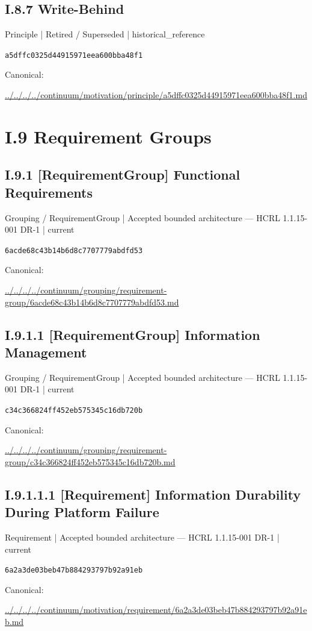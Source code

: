\documentclass[10pt,a4paper]{article}
\begin{document}
\subsection*{I.8.7 Write-Behind}
\label{element-a5dffc0325d44915971eea600bba48f1}
{\small Principle | Retired / Superseded | historical\_reference}\par
\texttt{a5dffc0325d44915971eea600bba48f1}\par
Canonical: \par
{\footnotesize\url{../../../../continuum/motivation/principle/a5dffc0325d44915971eea600bba48f1.md}}\par
\section*{I.9 Requirement Groups}
\subsection*{I.9.1 [RequirementGroup] Functional Requirements}
\label{element-6acde68c43b14b6d8c7707779abdfd53}
{\small Grouping / RequirementGroup | Accepted bounded architecture — HCRL 1.1.15-001 DR-1 | current}\par
\texttt{6acde68c43b14b6d8c7707779abdfd53}\par
Canonical: \par
{\footnotesize\url{../../../../continuum/grouping/requirement-group/6acde68c43b14b6d8c7707779abdfd53.md}}\par
\subsection*{I.9.1.1 [RequirementGroup] Information Management}
\label{element-c34c366824ff452eb575345c16db720b}
{\small Grouping / RequirementGroup | Accepted bounded architecture — HCRL 1.1.15-001 DR-1 | current}\par
\texttt{c34c366824ff452eb575345c16db720b}\par
Canonical: \par
{\footnotesize\url{../../../../continuum/grouping/requirement-group/c34c366824ff452eb575345c16db720b.md}}\par
\subsection*{I.9.1.1.1 [Requirement] Information Durability During Platform Failure}
\label{element-6a2a3de03beb47b884293797b92a91eb}
{\small Requirement | Accepted bounded architecture — HCRL 1.1.15-001 DR-1 | current}\par
\texttt{6a2a3de03beb47b884293797b92a91eb}\par
Canonical: \par
{\footnotesize\url{../../../../continuum/motivation/requirement/6a2a3de03beb47b884293797b92a91eb.md}}\par
\end{document}
